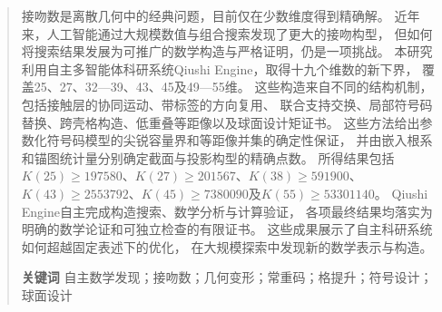 \begin{abstract}
接吻数是离散几何中的经典问题，目前仅在少数维度得到精确解。
近年来，人工智能通过大规模数值与组合搜索发现了更大的接吻构型，
但如何将搜索结果发展为可推广的数学构造与严格证明，仍是一项挑战。
本研究利用自主多智能体科研系统Qiushi Engine，取得十九个维数的新下界，
覆盖25、27、32—39、43、45及49—55维。
这些构造来自不同的结构机制，包括接触层的协同运动、带标签的方向复用、
联合支持交换、局部符号码替换、跨壳格构造、低重叠等距像以及球面设计矩证书。
这些方法给出参数化符号码模型的尖锐容量界和等距像并集的确定性保证，
并由嵌入根系和锚图统计量分别确定截面与投影构型的精确点数。
所得结果包括
$K(25)\ge197580$、$K(27)\ge201567$、$K(38)\ge591900$、
$K(43)\ge2553792$、$K(45)\ge7380090$及$K(55)\ge53301140$。
Qiushi Engine自主完成构造搜索、数学分析与计算验证，
各项最终结果均落实为明确的数学论证和可独立检查的有限证书。
这些成果展示了自主科研系统如何超越固定表述下的优化，
在大规模探索中发现新的数学表示与构造。

\par\smallskip\noindent\textbf{关键词}\quad
自主数学发现；接吻数；几何变形；常重码；格提升；符号设计；球面设计
\end{abstract}
